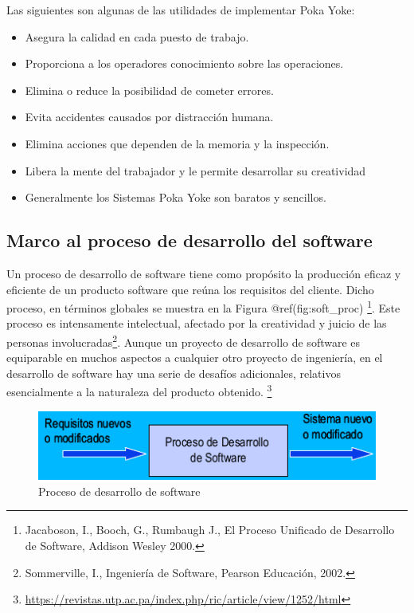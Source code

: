 \documentclass[
]{article}
\providecommand{\tightlist}{%
  \setlength{\itemsep}{0pt}\setlength{\parskip}{0pt}}
\begin{document}
Las siguientes son algunas de las utilidades de implementar Poka Yoke:

\begin{itemize}
\tightlist
\item
  Asegura la calidad en cada puesto de trabajo.
\item
  Proporciona a los operadores conocimiento sobre las operaciones.
\item
  Elimina o reduce la posibilidad de cometer errores.
\item
  Evita accidentes causados por distracción humana.
\item
  Elimina acciones que dependen de la memoria y la inspección.
\item
  Libera la mente del trabajador y le permite desarrollar su creatividad
\item
  Generalmente los Sistemas Poka Yoke son baratos y sencillos.
\end{itemize}

\hypertarget{marco-al-proceso-de-desarrollo-del-software}{%
\subsection{Marco al proceso de desarrollo del
software}\label{marco-al-proceso-de-desarrollo-del-software}}

Un proceso de desarrollo de software tiene como propósito la producción
eficaz y eficiente de un producto software que reúna los requisitos del
cliente. Dicho proceso, en términos globales se muestra en la Figura
@ref(fig:soft\_proc) \footnote{Jacaboson, I., Booch, G., Rumbaugh J., El
  Proceso Unificado de Desarrollo de Software, Addison Wesley 2000.}.
Este proceso es intensamente intelectual, afectado por la creatividad y
juicio de las personas involucradas\footnote{Sommerville, I., Ingeniería
  de Software, Pearson Educación, 2002.}. Aunque un proyecto de
desarrollo de software es equiparable en muchos aspectos a cualquier
otro proyecto de ingeniería, en el desarrollo de software hay una serie
de desafíos adicionales, relativos esencialmente a la naturaleza del
producto obtenido. \footnote{\url{https://revistas.utp.ac.pa/index.php/ric/article/view/1252/html}}

\begin{figure}

{\centering \includegraphics[width=0.5\linewidth]{marco teorico/Screenshot from 2021-11-09 04-03-10} 

}

\caption{Proceso de desarrollo de software}\label{fig:unnamed-chunk-4}
\end{figure}
\end{document}
